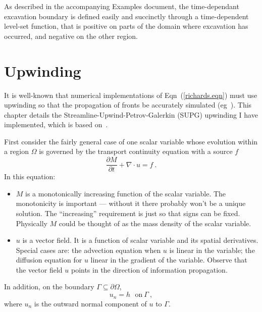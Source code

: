 \documentclass[]{scrreprt}
\begin{document}
As described in the accompanying Examples document, the time-dependant
excavation boundary is defined easily and succinctly through a time-dependent
level-set function, that is positive on parts of the domain where
excavation has occurred, and negative on the other region.




\chapter{Upwinding}
\label{chap.upwinding}

It is well-known that numerical implementations of
Eqn~(\ref{richards.eqn}) must use upwinding so that the propagation of
fronts be accurately simulated
(eg~\cite{huyakorn1978,dalen1979,helmig1998}).  This chapter details
the Streamline-Upwind-Petrov-Galerkin (SUPG) upwinding I have
implemented, which is based on~\cite{brooks1982, hughes1986}.

First consider the
fairly general case of one scalar variable whose evolution within a
region $\Omega$ is governed
by the transport continuity equation with a source $f$
\begin{equation}
\frac{\partial M}{\partial t} + \nabla\cdot u = f \ .
\label{eqn.continuity}
\end{equation}
In this equation:
\begin{itemize}
\item $M$ is a monotonically increasing function of the scalar variable.  The
  monotonicity is important --- without it there probably won't be a
  unique solution.  The ``increasing'' requirement is just so that
  signs can be fixed.   Physically $M$ could be thought of as the mass
  density of the scalar variable.
\item $u$ is a vector field.  It is a function of scalar variable and its
  spatial derivatives.  Special cases are: the advection equation when
  $u$ is linear in the variable; the diffusion equation for $u$ linear
  in the gradient of the variable.  Observe that the vector field $u$
  points in the direction of information propagation.
\end{itemize}
In addition, on the boundary $\Gamma \subseteq \partial\Omega$,
\begin{equation}
u_{n} = h \ \ \ \mbox{on}\ \Gamma \ ,
\end{equation}
where $u_{n}$ is the outward normal component of $u$ to $\Gamma$.
\end{document}
